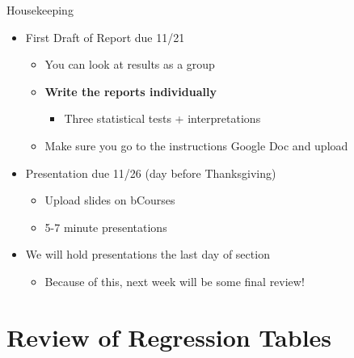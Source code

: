 \documentclass[
  11pt,
  ignorenonframetext,
]{beamer}
\providecommand{\tightlist}{%
  \setlength{\itemsep}{0pt}\setlength{\parskip}{0pt}}
\begin{document}
\begin{frame}{Housekeeping}
\protect{}\label{housekeeping}
\begin{itemize}
\tightlist
\item
  First Draft of Report due 11/21 \pause

  \begin{itemize}
  \tightlist
  \item
    You can look at results as a group \pause
  \item
    \textbf{Write the reports individually} \pause

    \begin{itemize}
    \tightlist
    \item
      Three statistical tests + interpretations \pause
    \end{itemize}
  \item
    Make sure you go to the instructions Google Doc and upload \pause
  \end{itemize}
\item
  Presentation due 11/26 (day before Thanksgiving) \pause

  \begin{itemize}
  \tightlist
  \item
    Upload slides on bCourses \pause
  \item
    5-7 minute presentations \pause
  \end{itemize}
\item
  We will hold presentations the last day of section \pause

  \begin{itemize}
  \tightlist
  \item
    Because of this, next week will be some final review!
  \end{itemize}
\end{itemize}
\end{frame}

\section{Review of Regression Tables}\label{review-of-regression-tables}
\end{document}
